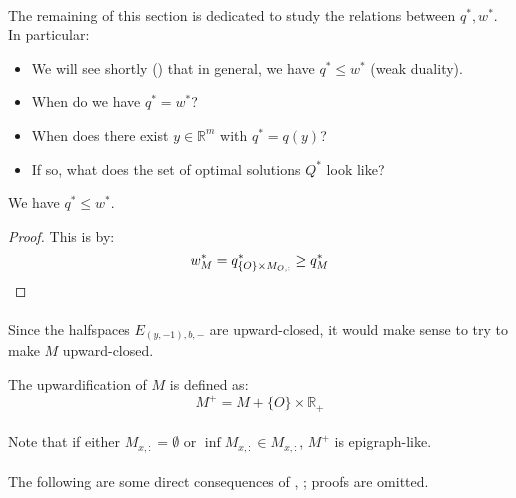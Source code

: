 \paragraph{}The remaining of this section is dedicated to study the relations between $q^\ast,w^\ast$. In particular:

\begin{itemize}
	\item We will see shortly () that in general, we have $q^\ast\leq w^\ast$ (weak duality).
	\item When do we have $q^\ast = w^\ast$?
	\item When does there exist $y\in \mathbb{R}^m$ with $q^\ast=q(y)$?
	\item If so, what does the set of optimal solutions $Q^\ast$ look like?
\end{itemize}

\begin{prop}\label{prop:031-weak-duality}
	We have $q^\ast\leq w^\ast$.
\end{prop}

\begin{proof}
	This is by:
	\[
		w_M^\ast = q^\ast_{\{O\}\times M_{O,:}} \geq q^\ast_M
		\qedhere
	\]
\end{proof}

\paragraph{}Since the halfspaces $E_{(y,-1),b,-}$ are upward-closed, it would make sense to try to make $M$ upward-closed.

\begin{defn}[Upwardification]\label{defn:031-upwardification}
	The upwardification of $M$ is defined as:
	\[
		M^+= M+\{O\}\times \mathbb{R}_{+}
	\]
\end{defn}

\paragraph{}Note that if either $M_{x,:}=\emptyset$ or $\inf M_{x,:}\in M_{x,:}$, $M^+$ is epigraph-like.

\paragraph{}The following are some direct consequences of , ; proofs are omitted.

